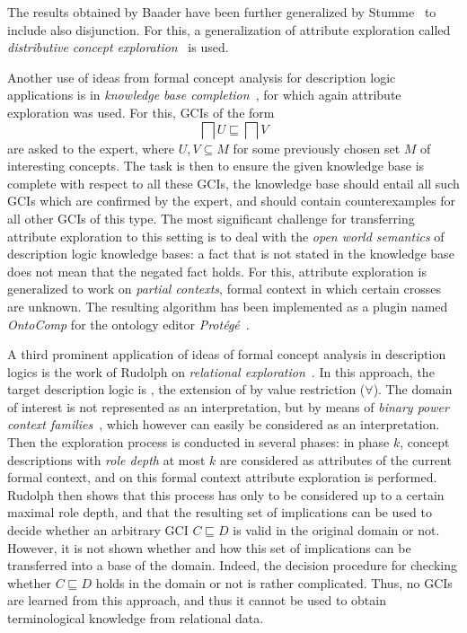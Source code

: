 The results obtained by Baader have been further generalized by
Stumme~\cite{stumme96concept} to include also disjunction.  For this, a generalization of
attribute exploration called \emph{distributive concept
  exploration}~\cite{conf/ki/Stumme98} is used.

Another use of ideas from formal concept analysis for description logic applications is in
\emph{knowledge base completion}~\cite{Sert07,conf/ijcai/BaaderGSS07}, for which again
attribute exploration was used.  For this, GCIs of the form
\begin{equation*}
  \bigsqcap U \sqsubseteq \bigsqcap V
\end{equation*}
are asked to the expert, where $U, V \subseteq M$ for some previously chosen set $M$ of
interesting concepts.  The task is then to ensure the given knowledge base is complete
with respect to all these GCIs, \ie the knowledge base should entail all such GCIs which
are confirmed by the expert, and should contain counterexamples for all other GCIs of this
type.  The most significant challenge for transferring attribute exploration to this
setting is to deal with the \emph{open world semantics} of description logic knowledge
bases: a fact that is not stated in the knowledge base does not mean that the negated fact
holds.  For this, attribute exploration is generalized to work on \emph{partial contexts},
\ie formal context in which certain crosses are unknown.  The resulting algorithm has been
implemented as a plugin named \emph{OntoComp} for the ontology editor
\emph{Protégé}~\cite{conf/esws/Sertkaya09}.

A third prominent application of ideas of formal concept analysis in description logics is
the work of Rudolph on \emph{relational
  exploration}~\cite{phd/de/Rudolph2006,conf/iccs/Rudolph04}.  In this approach, the
target description logic is \FLE, the extension of \EL by value restriction ($\forall$).
The domain of interest is not represented as an interpretation, but by means of
\emph{binary power context families}~\cite{DBLP:conf/iccs/PredigerW99}, which however can
easily be considered as an interpretation.  Then the exploration process is conducted in
several phases: in phase $k$, concept descriptions with \emph{role depth} at most $k$ are
considered as attributes of the current formal context, and on this formal context
attribute exploration is performed.  Rudolph then shows that this process has only to be
considered up to a certain maximal role depth, and that the resulting set of implications
can be used to decide whether an arbitrary GCI $C \sqsubseteq D$ is valid in the original
domain or not.  However, it is not shown whether and how this set of implications can be
transferred into a base of the domain.  Indeed, the decision procedure for checking
whether $C \sqsubseteq D$ holds in the domain or not is rather complicated.  Thus, no GCIs
are learned from this approach, and thus it cannot be used to obtain terminological
knowledge from relational data.

